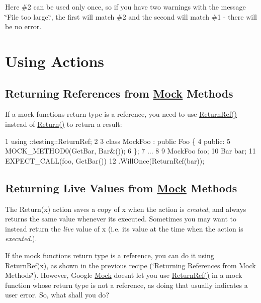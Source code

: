 Here \#2 can be used only once, so if you have two warnings with the message {\ttfamily \char`\"{}\+File too large.\char`\"{}}, the first will match \#2 and the second will match \#1 -\/ there will be no error.

\section*{Using Actions}

\subsection*{Returning References from \hyperlink{class_mock}{Mock} Methods}

If a mock function\textquotesingle{}s return type is a reference, you need to use {\ttfamily \hyperlink{namespacetesting_a18eda8fe9c89ee856c199a2e04ca1641}{Return\+Ref()}} instead of {\ttfamily \hyperlink{namespacetesting_af6d1c13e9376c77671e37545cd84359c}{Return()}} to return a result\+:


\begin{DoxyCode}
1 using ::testing::ReturnRef;
2 
3 class MockFoo : public Foo \{
4  public:
5   MOCK\_METHOD0(GetBar, Bar&());
6 \};
7 ...
8 
9   MockFoo foo;
10   Bar bar;
11   EXPECT\_CALL(foo, GetBar())
12       .WillOnce(ReturnRef(bar));
\end{DoxyCode}


\subsection*{Returning Live Values from \hyperlink{class_mock}{Mock} Methods}

The {\ttfamily Return(x)} action saves a copy of {\ttfamily x} when the action is {\itshape created}, and always returns the same value whenever it\textquotesingle{}s executed. Sometimes you may want to instead return the {\itshape live} value of {\ttfamily x} (i.\+e. its value at the time when the action is {\itshape executed}.).

If the mock function\textquotesingle{}s return type is a reference, you can do it using {\ttfamily Return\+Ref(x)}, as shown in the previous recipe (\char`\"{}\+Returning References
from Mock Methods\char`\"{}). However, Google \hyperlink{class_mock}{Mock} doesn\textquotesingle{}t let you use {\ttfamily \hyperlink{namespacetesting_a18eda8fe9c89ee856c199a2e04ca1641}{Return\+Ref()}} in a mock function whose return type is not a reference, as doing that usually indicates a user error. So, what shall you do?

